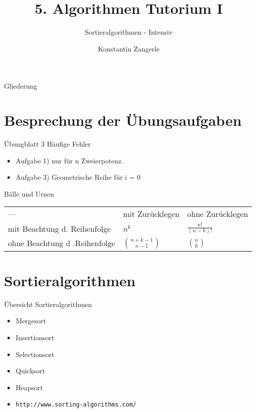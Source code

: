 \documentclass[18pt]{beamer}
\title[Algo I Tut]{5. Algorithmen Tutorium I}
\subtitle{Sortieralgorithmen - Intensiv}
\author[Zangerle]{Konstantin Zangerle}
\institute{Institut für Theoretische Informatik}
\begin{document}

\begin{frame}
\titlepage
\end{frame}

\begin{frame}{Gliederung}
 \tableofcontents
\end{frame}


\section{Besprechung der Übungsaufgaben}
\begin{frame}{Übungblatt 3}
Häufige Fehler
\begin{itemize}
 \item Aufgabe 1) nur für n Zweierpotenz.
 \item Aufgabe 3) Geometrische Reihe für i = 0 
\end{itemize}
\end{frame}


\begin{frame}{Bälle und Urnen}
 \begin{tabular}{lll}
  --- 				&	mit Zurücklegen 	& ohne Zurücklegen 	\\
 mit Beachtung d. Reihenfolge  	& 	$n^k$			& $\frac{n!}{(n-k)!}$	\\
 ohne Beachtung d .Reihenfolge 	& 	$\binom{n+k-1}{n-1}$	& $\binom{n}{k}$
 \end{tabular}

\end{frame}

\section{Sortieralgorithmen}
\begin{frame}[fragile]{Übersicht Sortieralgorithmen}
 \begin{itemize}
  \item Mergesort
  \item Insertionsort
  \item Selectionsort
  \item Quicksort
  \item Heapsort
  \item \verb|http://www.sorting-algorithms.com/|
 \end{itemize}

\end{frame}
\end{document}
